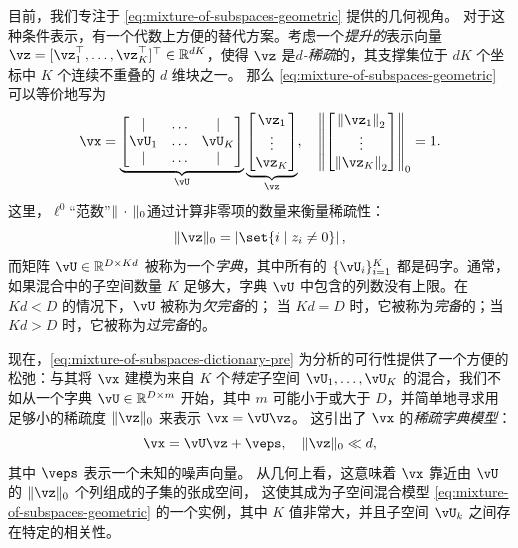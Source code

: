 \documentclass[../../book-main.tex]{subfiles}
\begin{document}
目前，我们专注于 \eqref{eq:mixture-of-subspaces-geometric} 提供的几何视角。
对于这种条件表示，有一个代数上方便的替代方案。考虑一个\textit{提升的}表示向量 $\vz = [\vz_1^\top, \dots, \vz_K^\top]^\top \in \R^{dK}$，使得 $\vz$ 是\textit{$d$-稀疏}的，其支撑集位于 $dK$ 个坐标中 $K$ 个连续不重叠的 $d$ 维块之一。
那么 \eqref{eq:mixture-of-subspaces-geometric} 可以等价地写为
\begin{equation}\label{eq:mixture-of-subspaces-dictionary-pre}
    \vx = 
    \underbrace{
    \begin{bmatrix} 
    | & \hdots & |  \\
    \vU_1 & \hdots & \vU_K  \\
    | & \hdots & | 
    \end{bmatrix} 
    }_{\vU}
    \underbrace{
    \begin{bmatrix} \vz_1 \\ \vdots \\ \vz_K \end{bmatrix}
    }_{\vz},
    \quad
    \norm*{
    \begin{bmatrix} \norm*{\vz_1}_2 \\ \vdots \\ \norm*{\vz_K}_2 \end{bmatrix}
    }_0 = 1.
\end{equation}
这里，$\ell^0$“范数”$\norm{\,\cdot\,}_0$通过计算非零项的数量来衡量稀疏性：
\begin{equation}\label{eq:ell-zero-norm}
    \norm{\vz}_0 = \abs*{\set{i \given z_i \neq 0}},
\end{equation}
而矩阵 $\vU \in \R^{D \times Kd}$ 被称为一个\textit{字典}，其中所有的 $\{\vU_i\}_{i=1}^K$ 都是码字。通常，如果混合中的子空间数量 $K$ 足够大，字典 $\vU$ 中包含的列数没有上限。在 $Kd < D$ 的情况下，$\vU$ 被称为\textit{欠完备}的；
当 $Kd = D$ 时，它被称为\textit{完备}的；当 $Kd > D$ 时，它被称为\textit{过完备}的。

现在，\eqref{eq:mixture-of-subspaces-dictionary-pre} 为分析的可行性提供了一个方便的松弛：与其将 $\vx$ 建模为来自 $K$ 个\textit{特定}子空间 $\vU_1, \dots, \vU_K$ 的混合，我们不如从一个字典 $\vU \in \R^{D \times m}$ 开始，其中 $m$ 可能小于或大于 $D$，并简单地寻求用足够小的稀疏度 $\norm{\vz}_0$ 来表示 $\vx = \vU \vz$。
这引出了 $\vx$ 的\textit{稀疏字典模型}：
\begin{equation}\label{eq:mixture-of-subspaces-dictionary}
    \vx =  \vU \vz + \veps,
    \quad
    \norm{\vz}_0 \ll d,
\end{equation}
其中 $\veps$ 表示一个未知的噪声向量。
从几何上看，这意味着 $\vx$ 靠近由 $\vU$ 的 $\norm{\vz}_0$ 个列组成的子集的张成空间，
这使其成为子空间混合模型 \eqref{eq:mixture-of-subspaces-geometric} 的一个实例，其中 $K$ 值非常大，并且子空间 $\vU_k$ 之间存在特定的相关性。
\end{document}
